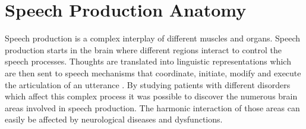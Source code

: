\begin{comment}
\begin{figure}[htbp]
\centering
 \subbottom[Example of games that can be used for SLP therapy.Descriptive game from ]{%
    \texttt{[image: gameSLP]}}%
 \subbottom[Electrglottograph also called laryngograph]{%
    \hspace{0.5cm}\texttt{[image: egg]}}
 \subbottom[Airflow machine]{%
    \texttt{[image: airflow\_machine]}}%
    \subbottom[ultrasound]{%
    \hspace{0.5cm}\texttt{[image: ultrasoundhat]}} 
 \subbottom[Palatometer with electrodes]{%
    \texttt{[image: palatometer]}}    	
\subbottom[Smart palate]{%
    \hspace{0.5cm}\texttt{[image: smartpalate]}}%
 
\caption{Devices used by SLPs}
\label{fig:tools}
\end{figure}





\end{comment}



\section{Speech Production Anatomy}
\label{sec:speechAnatomy}
Speech production is a complex interplay of different muscles and organs. Speech production starts in the brain where different regions interact to control the speech processes. Thoughts are translated into linguistic representations which are then sent to speech mechanisms that coordinate, initiate, modify and execute the articulation of an utterance \cite{Dronkers2004}. By studying patients with different disorders which affect this complex process it was possible to discover the numerous brain areas involved in speech production. The harmonic interaction of those areas can easily be affected by neurological diseases and dysfunctions. 

